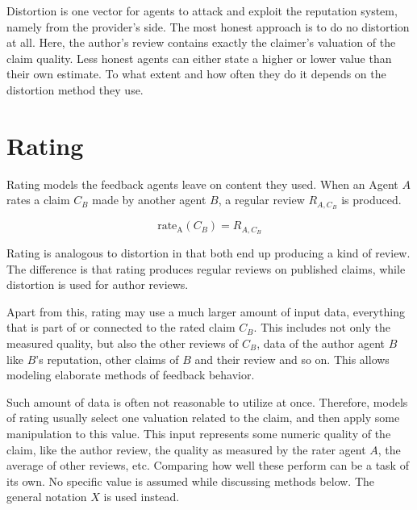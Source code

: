 \documentclass[%
    ]{\PathToTumTemplate/thesis/tum_thesis}
\begin{document}
Distortion is one vector for agents to attack and exploit the reputation system, namely from the provider's side.
The most honest approach is to do no distortion at all.
Here, the author's review contains exactly the claimer's valuation of the claim quality.
Less honest agents can either state a higher or lower value than their own estimate.
To what extent and how often they do it depends on the distortion method they use.




\section{Rating}\label{sec:approach_rating_strategies}

Rating models the feedback agents leave on content they used.
When an Agent $A$ rates a claim $C_B$ made by another agent $B$, a regular review $R_{A,C_{B}}$ is produced.

\begin{equation}
\mathrm{rate_{A}}(C_B) = R_{A, C_{B}}
\end{equation}

Rating is analogous to distortion in that both end up producing a kind of review.
The difference is that rating produces regular reviews on published claims, while distortion is used for author reviews.

Apart from this, rating may use a much larger amount of input data, everything that is part of or connected to the rated claim $C_B$.
This includes not only the measured quality, but also the other reviews of $C_B$, data of the author agent $B$ like $B$'s reputation, other claims of $B$ and their review and so on.
This allows modeling elaborate methods of feedback behavior.

Such amount of data is often not reasonable to utilize at once.
Therefore, models of rating usually select one valuation related to the claim, and then apply some manipulation to this value.
This input represents some numeric quality of the claim, like the author review, the quality as measured by the rater agent $A$, the average of other reviews, etc.
Comparing how well these perform can be a task of its own.
No specific value is assumed while discussing methods below.
The general notation $X$ is used instead.
\end{document}
